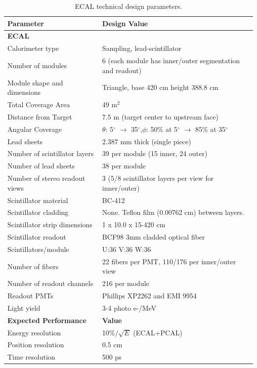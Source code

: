 \documentclass[letterpaper,10pt]{article}
\begin{document}
\begin{table}[htbp]
\begin{center}
\begin{tabular}{|l|l|} \hline
{\bf Parameter}        & {\bf Design Value} \\ \hline \hline
{\bf ECAL}         &              \\ \hline
Calorimeter type   & Sampling, lead-scintillator \\ \hline
Number of modules  & 6 (each module has inner/outer segmentation and readout)\\ \hline
Module shape and dimensions & Triangle, base 420 cm height 388.8 cm \\ \hline
Total Coverage Area      & 49 m$^2$ \\ \hline
Distance from Target & 7.5 m (target center to upstream face) \\ \hline
Angular Coverage   & $\theta$: 5$^\circ$ $\to$ 35$^\circ$,$\phi$: 50\% at 5$^\circ$ $\to$ 85\% at 35$^\circ$ \\ \hline
Lead sheets & 2.387 mm thick (single piece)\\ \hline
Number of scintillator layers & 39 per module (15 inner, 24 outer) \\ \hline
Number of lead sheets  & 38 per module \\ \hline
Number of stereo readout views & 3 (5/8 scintillator layers per view for inner/outer) \\ \hline
Scintillator material & BC-412\\ \hline
Scintillator cladding & None. Teflon film (0.00762 cm) between layers. \\ \hline
Scintillator strip dimensions & 1 x 10.0 x 15-420 cm \\ \hline
Scintillator readout & BCF98 3mm cladded optical fiber \\ \hline
Scintillators/module & U:36 V:36 W:36 \\ \hline
Number of fibers & 22 fibers per PMT, 110/176 per inner/outer view \\ \hline
Number of readout channels & 216 per module \\ \hline
Readout PMTs & Phillips XP2262 and EMI 9954 \\ \hline
Light yield & 3-4 photo e-/MeV \\ \hline \hline
{\bf Expected Performance} & {\bf Value} \\ \hline
Energy resolution & 10$\%/\sqrt E$ (ECAL+PCAL) \\ \hline
Position resolution & 0.5 cm \\ \hline
Time resolution & 500 ps \\ \hline

\end{tabular}
\end{center}
\caption{ECAL technical design parameters.} 
\label{tab:ftofproperties}
\end{table}
\end{document}

